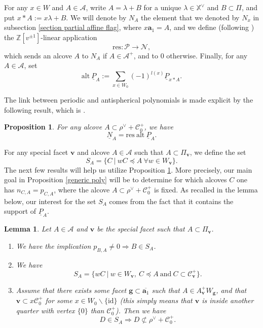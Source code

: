 \documentclass[11pt]{amsart}
\theoremstyle{plain}
\newtheorem{lem}[thm]{Lemma}
\newtheorem{prop}[thm]{Proposition}
\theoremstyle{remark}
\numberwithin{equation}{section}
\begin{document}
	For any $x\in W$ and $A\in\mathcal{A}$, write $A=\lambda+B$ for a unique $\lambda\in\mathbb{X}^\vee$ and $B\subset\Pi$, and put $x\ast A:= x\lambda+B$. We will denote by $N_A$ the element that we denoted by $N_x$ in subsection \ref{section partial affine flag}, where $x\mathbf{a}_1=A$, and we define (following \cite[Proposition 5.2]{Soergel1997KazhdanLusztigPA}) the $\mathbb{Z}[v^{\pm1}]$-linear application $$\mathrm{res}:\mathcal{P}\to \mathcal{N}, $$
	which sends an alcove $A$ to $N_A$ if $A\in\mathcal{A}^+$, and to $0$ otherwise. Finally, for any $A\in\mathcal{A}$, set 
	$$\mathrm{alt}~\underline{P}_A:=\sum_{x\in W_0}(-1)^{l(x)}\underline{P}_{x\ast A}. $$
	
	The link between periodic and antispherical polynomials is made explicit by the following result, which is \cite[Theorem 5.3(1)]{Soergel1997KazhdanLusztigPA}.
	\begin{prop}\label{period and antisph}
		For any alcove $A\subset \rho^\vee+\mathscr{C}^+_0$, we have 
		$$\underline{N}_A=\mathrm{res}~\mathrm{alt}~\underline{P}_A.$$
	\end{prop}
	For any special facet $\mathbf{v}$ and alcove $A\in\mathcal{A}$ such that $A\subset \Pi_\mathbf{v}$, we define the set
	$$S_A=\{C~|~wC\preceq A~\forall w\in W_\mathbf{v}\}. $$ 
	The next few results will help us utilize Proposition \ref{period and antisph}. More precisely, our main goal in Proposition \ref{generic poly} will be to determine for which alcoves $C$ one has $n_{C,A}=p_{C,A}$, where the alcove $A\subset\rho^\vee+\mathscr{C}_0^+$ is fixed. As recalled in the lemma below, our interest for the set $S_A$ comes from the fact that it contains the support of $\underline{P}_A$.
	\begin{lem}\label{support poly perio}
		Let $A\in\mathcal{A}$ and $\mathbf{v}$ be the special facet such that $A\subset\Pi_\mathbf{v}$. 
		\begin{enumerate}
			\item We have the implication $p_{B,A}\neq0\Rightarrow B\in S_A$.
			\item We have 
			$$S_A=\{wC~|~w\in W_\mathbf{v},~C\preceq A~\text{and}~ C\subset \mathscr{C}^+_\mathbf{v}\}. $$
			\item Assume that there exists some facet $\mathbf{g}\subset\overline{\mathbf{a}_1}$ such that $A\in A^+_\mathbf{v}W_\mathbf{g}$, and that $\mathbf{v}\subset x\mathscr{C}^+_0$ for some $x\in W_0\backslash\{\mathrm{id}\}$ (this simply means that $\mathbf{v}$ is inside another quarter with vertex $\{0\}$ than $\mathscr{C}^+_0$). Then we have 
			$$D\in S_A\Rightarrow D\not\subset\rho^\vee+\mathscr{C}^+_0.$$
		\end{enumerate}
	\end{lem}
\end{document}
